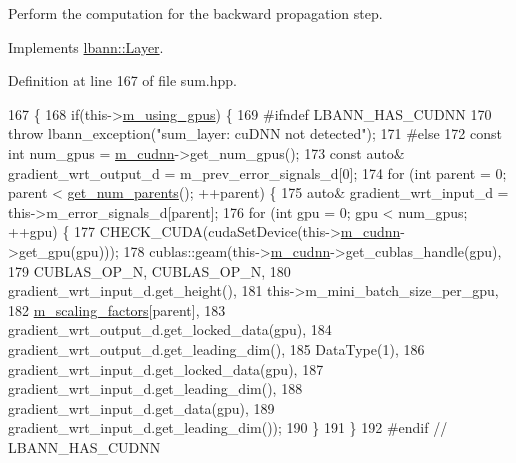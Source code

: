 Perform the computation for the backward propagation step. 

Implements \hyperlink{classlbann_1_1Layer_a7442e01f9ee1294df2de811efcf5171e}{lbann\+::\+Layer}.



Definition at line 167 of file sum.\+hpp.


\begin{DoxyCode}
167                              \{
168     \textcolor{keywordflow}{if}(this->\hyperlink{classlbann_1_1Layer_af7881cb5eff5207c15fa835d65462e8f}{m\_using\_gpus}) \{
169 \textcolor{preprocessor}{  #ifndef LBANN\_HAS\_CUDNN}
170       \textcolor{keywordflow}{throw} lbann\_exception(\textcolor{stringliteral}{"sum\_layer: cuDNN not detected"});
171 \textcolor{preprocessor}{  #else}
172       \textcolor{keyword}{const} \textcolor{keywordtype}{int} num\_gpus = \hyperlink{classlbann_1_1Layer_a08dbb94239e3b8c96329786c57c72e21}{m\_cudnn}->get\_num\_gpus();
173       \textcolor{keyword}{const} \textcolor{keyword}{auto}& gradient\_wrt\_output\_d = m\_prev\_error\_signals\_d[0];
174       \textcolor{keywordflow}{for} (\textcolor{keywordtype}{int} parent = 0; parent < \hyperlink{classlbann_1_1Layer_ac9290d4a6453ccda5f6b4d8b57b49ba3}{get\_num\_parents}(); ++parent) \{
175         \textcolor{keyword}{auto}& gradient\_wrt\_input\_d = this->m\_error\_signals\_d[parent];
176         \textcolor{keywordflow}{for} (\textcolor{keywordtype}{int} gpu = 0; gpu < num\_gpus; ++gpu) \{
177           CHECK\_CUDA(cudaSetDevice(this->\hyperlink{classlbann_1_1Layer_a08dbb94239e3b8c96329786c57c72e21}{m\_cudnn}->get\_gpu(gpu)));
178           cublas::geam(this->\hyperlink{classlbann_1_1Layer_a08dbb94239e3b8c96329786c57c72e21}{m\_cudnn}->get\_cublas\_handle(gpu),
179                        CUBLAS\_OP\_N, CUBLAS\_OP\_N,
180                        gradient\_wrt\_input\_d.get\_height(),
181                        this->m\_mini\_batch\_size\_per\_gpu,
182                        \hyperlink{classlbann_1_1sum__layer_a371ae9038d8654fbca134e0f61e1e29a}{m\_scaling\_factors}[parent],
183                        gradient\_wrt\_output\_d.get\_locked\_data(gpu),
184                        gradient\_wrt\_output\_d.get\_leading\_dim(),
185                        DataType(1),
186                        gradient\_wrt\_input\_d.get\_locked\_data(gpu),
187                        gradient\_wrt\_input\_d.get\_leading\_dim(),
188                        gradient\_wrt\_input\_d.get\_data(gpu),
189                        gradient\_wrt\_input\_d.get\_leading\_dim());
190         \}
191       \}
192 \textcolor{preprocessor}{  #endif // LBANN\_HAS\_CUDNN}

\end{DoxyCode}
